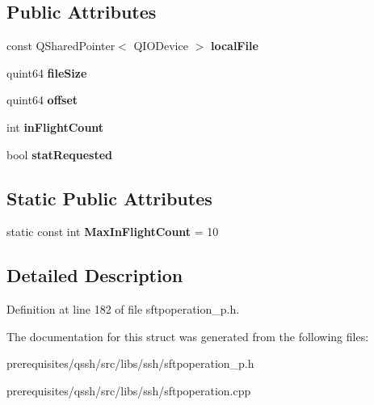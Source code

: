 \subsection*{Public Attributes}
\begin{DoxyCompactItemize}
\item 
\mbox{\label{struct_q_ssh_1_1_internal_1_1_abstract_sftp_transfer_ae15ebf6cd3b2df09027b77f408ab6cb5}} 
const Q\+Shared\+Pointer$<$ Q\+I\+O\+Device $>$ {\bfseries local\+File}
\item 
\mbox{\label{struct_q_ssh_1_1_internal_1_1_abstract_sftp_transfer_a3e4c1e681208e4d3d453fd74f74c61d1}} 
quint64 {\bfseries file\+Size}
\item 
\mbox{\label{struct_q_ssh_1_1_internal_1_1_abstract_sftp_transfer_a4904955a52d99d9c405ad3d835292c00}} 
quint64 {\bfseries offset}
\item 
\mbox{\label{struct_q_ssh_1_1_internal_1_1_abstract_sftp_transfer_ac087f235589b4d2552752c737fe37ad3}} 
int {\bfseries in\+Flight\+Count}
\item 
\mbox{\label{struct_q_ssh_1_1_internal_1_1_abstract_sftp_transfer_a79179fd6ead1c45dcb3f3b646190ff51}} 
bool {\bfseries stat\+Requested}
\end{DoxyCompactItemize}
\subsection*{Static Public Attributes}
\begin{DoxyCompactItemize}
\item 
\mbox{\label{struct_q_ssh_1_1_internal_1_1_abstract_sftp_transfer_ae9eaa231ee6aba11420020f070372da2}} 
static const int {\bfseries Max\+In\+Flight\+Count} = 10
\end{DoxyCompactItemize}


\subsection{Detailed Description}


Definition at line 182 of file sftpoperation\+\_\+p.\+h.



The documentation for this struct was generated from the following files\+:\begin{DoxyCompactItemize}
\item 
prerequisites/qssh/src/libs/ssh/sftpoperation\+\_\+p.\+h\item 
prerequisites/qssh/src/libs/ssh/sftpoperation.\+cpp\end{DoxyCompactItemize}
